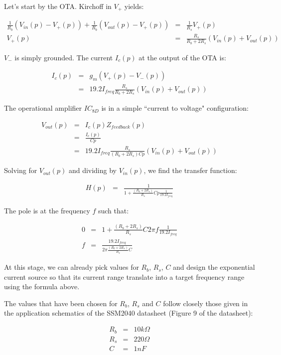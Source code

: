 \documentclass[a4paper,11pt]{article}
\begin{document}
Let's start by the OTA. Kirchoff in $V_+$ yields:

\begin{eqnarray}
\frac{1}{R_b}(V_{in}(p) - V_+(p)) + \frac{1}{R_b} (V_{out}(p) - V_+(p)) &=& \frac{1}{R_s} V_+(p) \\
V_+(p) &=& \frac{R_s}{R_b + 2 R_s} (V_{in}(p) + V_{out}(p))
\end{eqnarray}

$V_-$ is simply grounded. The current $I_c(p)$ at the output of the OTA is:

\begin{eqnarray}
I_c(p) &=& g_m (V_+(p) - V_-(p)) \\
 &=& 19.2 I_{freq} \frac{R_s}{R_b + 2 R_s} (V_{in}(p) + V_{out}(p))
\end{eqnarray}

The operational amplifier $IC_{8D}$ is in a simple ``current to voltage" configuration:

\begin{eqnarray}
V_{out}(p) &=& I_c(p) Z_{feedback}(p) \\
 &=& \frac{I_c(p)}{Cp} \\
 &=& 19.2 I_{freq} \frac{R_s}{(R_b + 2 R_s)Cp} (V_{in}(p) + V_{out}(p))
\end{eqnarray}

Solving for $V_{out}(p)$ and dividing by $V_{in}(p)$, we find the transfer function:

\begin{eqnarray}
H(p) &=& \frac{1}{1 + \frac{(R_b + 2 R_s)}{R_s} Cp \frac{1}{19.2 I_{freq}}}
\end{eqnarray}

The pole is at the frequency $f$ such that:

\begin{eqnarray}
0 &=& 1 + \frac{(R_b + 2 R_s)}{R_s} C 2\pi f \frac{1}{19.2 I_{freq}} \\
f &=& \frac{19.2 I_{freq}}{2 \pi \frac{(R_b + 2 R_s)}{R_s} C}
\end{eqnarray}

At this stage, we can already pick values for $R_b$, $R_s$, $C$ and design the exponential current source so that its current range translate into a target frequency range using the formula above.

The values that have been chosen for $R_b$, $R_s$ and $C$ follow closely those given in the application schematics of the SSM2040 datasheet (Figure 9 of the datasheet):

\begin{eqnarray*}
R_b &=& 10 k \Omega \\
R_s &=& 220 \Omega \\
C &=& 1 nF
\end{eqnarray*}
\end{document}

